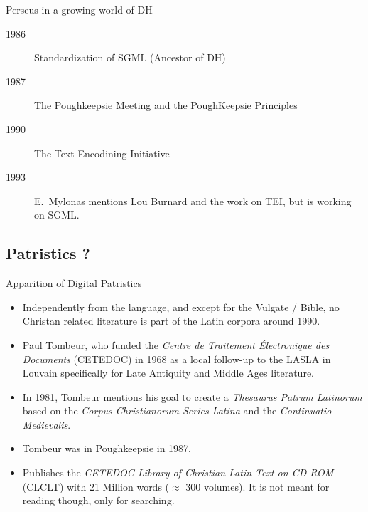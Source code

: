 \documentclass[aspectratio=169]{beamer}
\begin{document}
\begin{frame}{Perseus in a growing world of DH}
    \begin{description}
        \item[1986] Standardization of SGML (Ancestor of DH)
        \item[1987] The Poughkeepsie Meeting and the PoughKeepsie Principles
        \item[1990] The Text Encodining Initiative
        \item[1993] E.~Mylonas mentions Lou Burnard and the work on TEI, but is working on SGML.
    \end{description}
\end{frame}

\subsection{Patristics ?}

\begin{frame}{Apparition of Digital Patristics}
    \begin{itemize}
        \item Independently from the language, and except for the Vulgate / Bible, no Christan related literature is part of the Latin corpora around 1990.
        \item Paul Tombeur, who funded the \textit{Centre de Traitement Électronique des Documents }(CETEDOC) in 1968 as a local follow-up to the LASLA in Louvain specifically for Late Antiquity and Middle Ages literature.
        \item In 1981, Tombeur mentions his goal to create a \textit{Thesaurus Patrum Latinorum} based on the \textit{Corpus Christianorum Series Latina} and the \textit{Continuatio Medievalis}.
        \item Tombeur was in Poughkeepsie in 1987.
        \item Publishes the \textit{CETEDOC Library of Christian Latin Text on CD-ROM} (CLCLT) with 21 Million words ($\approx$ 300 volumes). It is not meant for reading though, only for searching.
    \end{itemize}
\end{frame}
\end{document}
